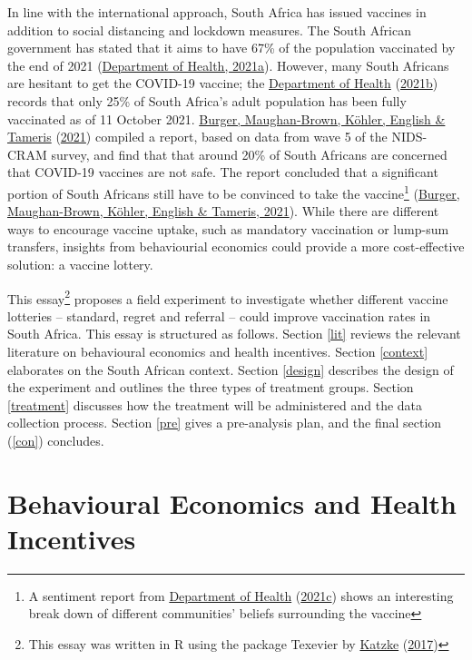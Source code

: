 \documentclass[11pt,preprint, authoryear]{elsarticle}
\numberwithin{equation}{section}
\numberwithin{figure}{section}
\numberwithin{table}{section}
\let\rmarkdownfootnote\footnote%
\def\footnote{\protect\rmarkdownfootnote}
\begin{document}
In line with the international approach, South Africa has issued
vaccines in addition to social distancing and lockdown measures. The
South African government has stated that it aims to have 67\% of the
population vaccinated by the end of 2021
(\protect\hyperlink{ref-herd}{Department of Health, 2021a}). However,
many South Africans are hesitant to get the COVID-19 vaccine; the
\protect\hyperlink{ref-stat}{Department of Health}
(\protect\hyperlink{ref-stat}{2021b}) records that only 25\% of South
Africa's adult population has been fully vaccinated as of 11 October
2021. \protect\hyperlink{ref-cram}{Burger, Maughan-Brown, Köhler,
English \& Tameris} (\protect\hyperlink{ref-cram}{2021}) compiled a
report, based on data from wave 5 of the NIDS-CRAM survey, and find that
that around 20\% of South Africans are concerned that COVID-19 vaccines
are not safe. The report concluded that a significant portion of South
Africans still have to be convinced to take the vaccine\footnote{A
  sentiment report from \protect\hyperlink{ref-report}{Department of
  Health} (\protect\hyperlink{ref-report}{2021c}) shows an interesting
  break down of different communities' beliefs surrounding the vaccine}
(\protect\hyperlink{ref-cram}{Burger, Maughan-Brown, Köhler, English \&
Tameris, 2021}). While there are different ways to encourage vaccine
uptake, such as mandatory vaccination or lump-sum transfers, insights
from behaviourial economics could provide a more cost-effective
solution: a vaccine lottery.

This essay\footnote{This essay was written in R using the package
  Texevier by \protect\hyperlink{ref-Texevier}{Katzke}
  (\protect\hyperlink{ref-Texevier}{2017})} proposes a field experiment
to investigate whether different vaccine lotteries -- standard, regret
and referral -- could improve vaccination rates in South Africa. This
essay is structured as follows. Section \ref{lit} reviews the relevant
literature on behavioural economics and health incentives. Section
\ref{context} elaborates on the South African context. Section
\ref{design} describes the design of the experiment and outlines the
three types of treatment groups. Section \ref{treatment} discusses how
the treatment will be administered and the data collection process.
Section \ref{pre} gives a pre-analysis plan, and the final section
(\ref{con}) concludes.

\hypertarget{behavioural-economics-and-health-incentives}{%
\section{\texorpdfstring{Behavioural Economics and Health Incentives
\label{lit}}{Behavioural Economics and Health Incentives }}\label{behavioural-economics-and-health-incentives}}
\end{document}
